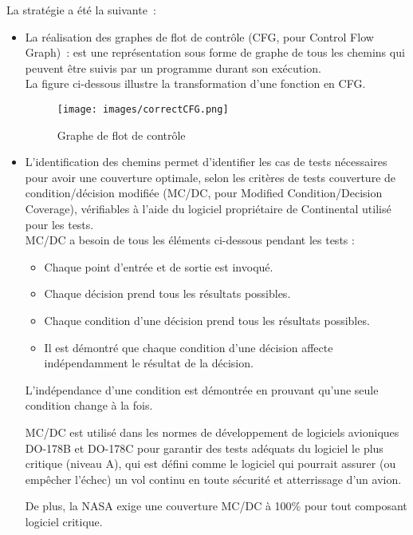 \documentclass[a4paper, 12pt]{report}
\begin{document}
La stratégie a été la suivante :
    \begin{itemize}
        \item La réalisation des graphes de flot de contrôle (\acs{CFG}, pour Control Flow Graph) : est une représentation sous forme de graphe de tous les chemins qui peuvent être suivis par un programme durant son exécution.\\

         La figure ci-dessous illustre la transformation d'une fonction en CFG.
          \begin{figure}[H]
            \centering
            \texttt{[image: images/correctCFG.png]}
            \caption{Graphe de flot de contrôle}
            \label{fig:cfg}
        \end{figure}
       
        
        \item L'identification des chemins permet d'identifier les cas de tests nécessaires pour avoir une couverture optimale, selon les critères de tests couverture de condition/décision modifiée (\acs{MC/DC}, pour Modified Condition/Decision Coverage), vérifiables à l'aide du logiciel propriétaire de Continental utilisé pour les tests.\\
    MC/DC a besoin de tous les éléments ci-dessous pendant les tests :
    \begin{itemize}
        \item Chaque point d'entrée et de sortie est invoqué.
        \item Chaque décision prend tous les résultats possibles.
        \item Chaque condition d'une décision prend tous les résultats 
        possibles.
        \item Il est démontré que chaque condition d’une décision affecte indépendamment le résultat de la décision.
    \end{itemize}
    L’indépendance d’une condition est démontrée en prouvant qu’une seule condition change à la fois.
    
    MC/DC est utilisé dans les normes de développement de logiciels avioniques DO-178B et DO-178C \cite{wikipedia_mcdc} pour garantir des tests adéquats du logiciel le plus critique (niveau A), qui est défini comme le logiciel qui pourrait assurer (ou empêcher l'échec) un vol continu en toute sécurité et atterrissage d'un avion.
    
    De plus, la NASA exige une couverture MC/DC à 100\% pour tout composant logiciel critique.
    \end{itemize}
    
\end{document}

